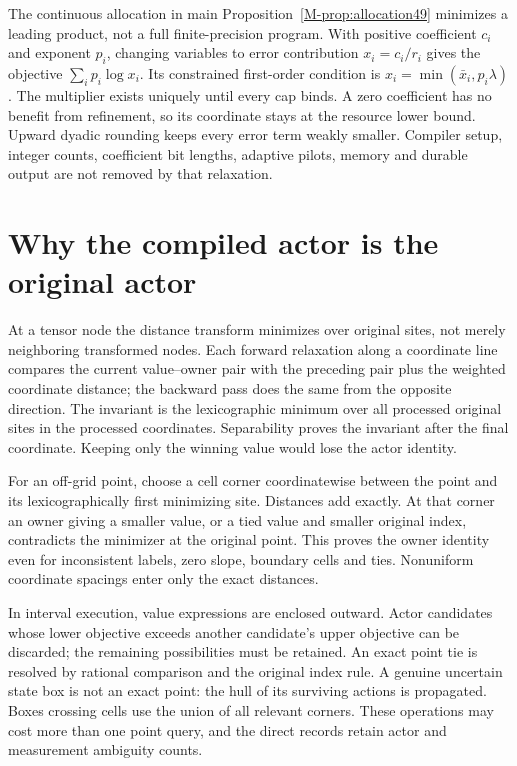 \documentclass[ecta,nameyear,draft]{econsocart}
\begin{document}
The continuous allocation in main Proposition~\ref{M-prop:allocation49} minimizes a leading product, not a full finite-precision program. With positive coefficient $c_i$ and exponent $p_i$, changing variables to error contribution $x_i=c_i/r_i$ gives the objective $\sum_i p_i\log x_i$. Its constrained first-order condition is $x_i=\min(\bar x_i,p_i\lambda)$. The multiplier exists uniquely until every cap binds. A zero coefficient has no benefit from refinement, so its coordinate stays at the resource lower bound. Upward dyadic rounding keeps every error term weakly smaller. Compiler setup, integer counts, coefficient bit lengths, adaptive pilots, memory and durable output are not removed by that relaxation.

\section{Why the compiled actor is the original actor}\label{supp:owner49}
At a tensor node the distance transform minimizes over original sites, not merely neighboring transformed nodes. Each forward relaxation along a coordinate line compares the current value--owner pair with the preceding pair plus the weighted coordinate distance; the backward pass does the same from the opposite direction. The invariant is the lexicographic minimum over all processed original sites in the processed coordinates. Separability proves the invariant after the final coordinate. Keeping only the winning value would lose the actor identity.

For an off-grid point, choose a cell corner coordinatewise between the point and its lexicographically first minimizing site. Distances add exactly. At that corner an owner giving a smaller value, or a tied value and smaller original index, contradicts the minimizer at the original point. This proves the owner identity even for inconsistent labels, zero slope, boundary cells and ties. Nonuniform coordinate spacings enter only the exact distances.

In interval execution, value expressions are enclosed outward. Actor candidates whose lower objective exceeds another candidate's upper objective can be discarded; the remaining possibilities must be retained. An exact point tie is resolved by rational comparison and the original index rule. A genuine uncertain state box is not an exact point: the hull of its surviving actions is propagated. Boxes crossing cells use the union of all relevant corners. These operations may cost more than one point query, and the direct records retain actor and measurement ambiguity counts.
\end{document}
